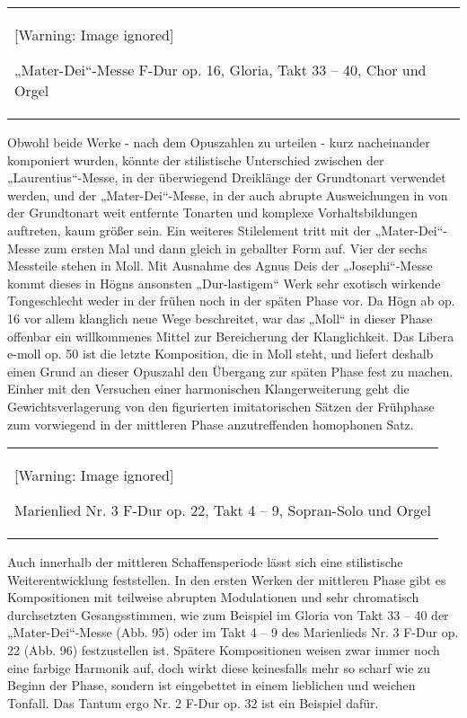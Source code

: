 \begin{center}
\tablefirsthead{}
\tablehead{}
\tabletail{}
\tablelasttail{}
\begin{supertabular}{m{12.027cm}}
  [Warning: Image ignored] %

\label{bkm:Ref99946240}
„Mater-Dei“-Messe F-Dur op. 16, Gloria, Takt  33 – 40, Chor und Orgel\\
\end{supertabular}
\end{center}
Obwohl beide Werke - nach dem Opuszahlen zu urteilen - kurz nacheinander
komponiert wurden, könnte der stilistische Unterschied zwischen der
„Laurentius“-Messe, in der überwiegend Dreiklänge der Grundtonart
verwendet werden, und der „Mater-Dei“-Messe, in der auch abrupte
Ausweichungen in von der Grundtonart weit entfernte Tonarten und
komplexe Vorhaltsbildungen auftreten, kaum größer sein. Ein weiteres
Stilelement tritt mit der „Mater-Dei“-Messe zum ersten Mal und dann
gleich in geballter Form auf. Vier der sechs Messteile stehen in Moll.
Mit Ausnahme des Agnus Deis der „Josephi“-Messe kommt dieses in Högns
ansonsten „Dur-lastigem“ Werk sehr exotisch wirkende Tongeschlecht
weder in der frühen noch in der späten Phase vor. Da Högn ab op. 16 vor
allem klanglich neue Wege beschreitet, war das „Moll“ in dieser Phase
offenbar ein willkommenes Mittel zur Bereicherung der Klanglichkeit.
Das Libera e-moll op. 50 ist die letzte Komposition, die in Moll steht,
und liefert deshalb einen Grund an dieser Opuszahl den Übergang zur
späten Phase fest zu machen. Einher mit den Versuchen einer
harmonischen Klangerweiterung geht die Gewichtsverlagerung von den
figurierten imitatorischen Sätzen der Frühphase zum vorwiegend in der
mittleren Phase anzutreffenden homophonen Satz.

\begin{center}
\tablefirsthead{}
\tablehead{}
\tabletail{}
\tablelasttail{}
\begin{supertabular}{m{11.78cm}}
  [Warning: Image ignored] %

\label{bkm:Ref99946259}Marienlied Nr. 3
F-Dur op. 22, Takt 4 – 9, Sopran-Solo und Orgel\\
\end{supertabular}
\end{center}
Auch innerhalb der mittleren Schaffensperiode lässt sich eine
stilistische Weiterentwicklung feststellen. In den ersten Werken der
mittleren Phase gibt es Kompositionen mit teilweise abrupten
Modulationen und sehr chromatisch durchsetzten Gesangsstimmen, wie zum
Beispiel im Gloria von Takt 33 – 40 der „Mater-Dei“-Messe (Abb. 95)
oder im Takt 4 – 9 des Marienlieds Nr. 3 F-Dur op. 22 (Abb. 96)
festzustellen ist. Spätere Kompositionen weisen zwar immer noch eine
farbige Harmonik auf, doch wirkt diese keinesfalls mehr so scharf wie
zu Beginn der Phase, sondern ist eingebettet in einem lieblichen und
weichen Tonfall. Das Tantum ergo Nr. 2 F-Dur op. 32 ist ein Beispiel
dafür.

